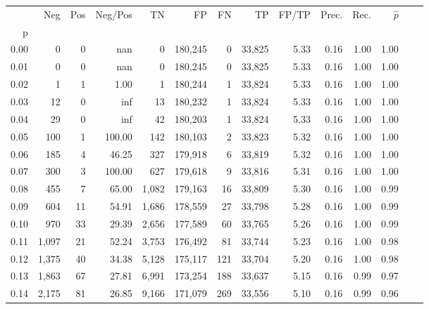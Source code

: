 \begin{tabular}{rrrrrrrrrrrrrr}
\toprule
{} &    Neg &    Pos & Neg/Pos &       TN &       FP &      FN &      TP & FP/TP & Prec. &  Rec. & $\hat{p}$ \\
p    &        &        &         &          &          &         &         &       &       &       &           \\
\midrule
0.00 &      0 &      0 &     nan &        0 &  180,245 &       0 &  33,825 &  5.33 &  0.16 &  1.00 &      1.00 \\
0.01 &      0 &      0 &     nan &        0 &  180,245 &       0 &  33,825 &  5.33 &  0.16 &  1.00 &      1.00 \\
0.02 &      1 &      1 &    1.00 &        1 &  180,244 &       1 &  33,824 &  5.33 &  0.16 &  1.00 &      1.00 \\
0.03 &     12 &      0 &     inf &       13 &  180,232 &       1 &  33,824 &  5.33 &  0.16 &  1.00 &      1.00 \\
0.04 &     29 &      0 &     inf &       42 &  180,203 &       1 &  33,824 &  5.33 &  0.16 &  1.00 &      1.00 \\
0.05 &    100 &      1 &  100.00 &      142 &  180,103 &       2 &  33,823 &  5.32 &  0.16 &  1.00 &      1.00 \\
0.06 &    185 &      4 &   46.25 &      327 &  179,918 &       6 &  33,819 &  5.32 &  0.16 &  1.00 &      1.00 \\
0.07 &    300 &      3 &  100.00 &      627 &  179,618 &       9 &  33,816 &  5.31 &  0.16 &  1.00 &      1.00 \\
0.08 &    455 &      7 &   65.00 &    1,082 &  179,163 &      16 &  33,809 &  5.30 &  0.16 &  1.00 &      0.99 \\
0.09 &    604 &     11 &   54.91 &    1,686 &  178,559 &      27 &  33,798 &  5.28 &  0.16 &  1.00 &      0.99 \\
0.10 &    970 &     33 &   29.39 &    2,656 &  177,589 &      60 &  33,765 &  5.26 &  0.16 &  1.00 &      0.99 \\
0.11 &  1,097 &     21 &   52.24 &    3,753 &  176,492 &      81 &  33,744 &  5.23 &  0.16 &  1.00 &      0.98 \\
0.12 &  1,375 &     40 &   34.38 &    5,128 &  175,117 &     121 &  33,704 &  5.20 &  0.16 &  1.00 &      0.98 \\
0.13 &  1,863 &     67 &   27.81 &    6,991 &  173,254 &     188 &  33,637 &  5.15 &  0.16 &  0.99 &      0.97 \\
0.14 &  2,175 &     81 &   26.85 &    9,166 &  171,079 &     269 &  33,556 &  5.10 &  0.16 &  0.99 &      0.96 \\

\end{tabular}

